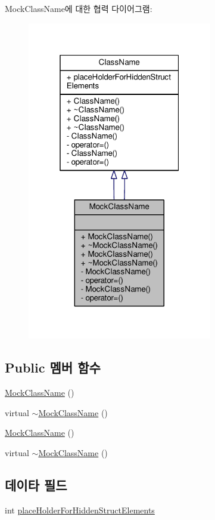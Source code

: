 Mock\+Class\+Name에 대한 협력 다이어그램\+:
\nopagebreak
\begin{figure}[H]
\begin{center}
\leavevmode
\includegraphics[width=229pt]{class_mock_class_name__coll__graph}
\end{center}
\end{figure}
\subsection*{Public 멤버 함수}
\begin{DoxyCompactItemize}
\item 
\hyperlink{class_mock_class_name_a5d145d16c2129220548a71608f6984cb}{Mock\+Class\+Name} ()
\item 
virtual \hyperlink{class_mock_class_name_ac3be669c0bcd712f79be5526e6a6b408}{$\sim$\+Mock\+Class\+Name} ()
\item 
\hyperlink{class_mock_class_name_a5d145d16c2129220548a71608f6984cb}{Mock\+Class\+Name} ()
\item 
virtual \hyperlink{class_mock_class_name_ac3be669c0bcd712f79be5526e6a6b408}{$\sim$\+Mock\+Class\+Name} ()
\end{DoxyCompactItemize}
\subsection*{데이타 필드}
\begin{DoxyCompactItemize}
\item 
int \hyperlink{class_class_name_a5705d42d83aa1408a1f19b218cd11502}{place\+Holder\+For\+Hidden\+Struct\+Elements}
\end{DoxyCompactItemize}
